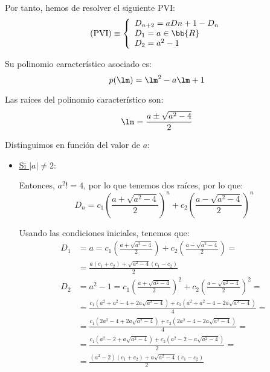 \begin{ejercicio}
    Por tanto, hemos de resolver el siguiente PVI:
    \begin{equation*}
        \text{(PVI)}\equiv \left\{ \begin{array}{l}
            D_{n+2}=aD{n+1}-D_n\\
            D_1=a\in \bb{R}\\
            D_2=a^2-1
        \end{array}\right.
    \end{equation*}
    
    Su polinomio característico asociado es:
    \begin{equation*}
        p(\lm) = \lm^2-a\lm +1
    \end{equation*}

    Las raíces del polinomio característico son:
    \begin{equation*}
        \lm = \frac{a\pm \sqrt{a^2-4}}{2}
    \end{equation*}

    Distinguimos en función del valor de $a$:
    \begin{itemize}
        \item \ul{Si $|a|\neq 2$}:

        Entonces, $a^2!=4$, por lo que tenemos dos raíces, por lo que:
        \begin{equation*}
            D_n = c_1\left(\frac{a +\sqrt{a^2-4}}{2}\right)^n
            + c_2\left(\frac{a -\sqrt{a^2-4}}{2}\right)^n
        \end{equation*}

        Usando las condiciones iniciales, tenemos que:
        \begin{align*}
            D_1 &= a = c_1\left(\frac{a +\sqrt{a^2-4}}{2}\right)
            + c_2\left(\frac{a -\sqrt{a^2-4}}{2}\right) =\\
            &=\frac{a(c_1+c_2) +\sqrt{a^2-4}(c_1-c_2)}{2} \\
            D_2 &= a^2-1 = c_1\left(\frac{a +\sqrt{a^2-4}}{2}\right)^2
            + c_2\left(\frac{a -\sqrt{a^2-4}}{2}\right)^2 =\\
            &= \frac{c_1(a^2+a^2-4+2a\sqrt{a^2-4}) +c_2(a^2+a^2-4-2a\sqrt{a^2-4})}{4}=\\
            &= \frac{c_1(2a^2-4+2a\sqrt{a^2-4}) +c_2(2a^2-4-2a\sqrt{a^2-4})}{4}=\\
            &= \frac{c_1(a^2-2+a\sqrt{a^2-4}) +c_2(a^2-2-a\sqrt{a^2-4})}{2}=\\
            &= \frac{(a^2-2)(c_1+c_2)+a\sqrt{a^2-4}(c_1-c_2)}{2}
        \end{align*}


\end{itemize}
\end{ejercicio}

